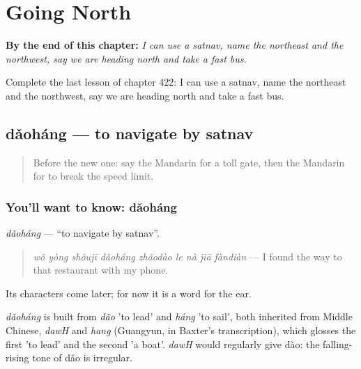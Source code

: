 
\chapter{Going North}
\label{ch:zh-going-north}

\begin{chapteropening}
\textbf{By the end of this chapter:} \emph{I can use a satnav, name the northeast and the northwest, say we are heading north and take a fast bus.}

Complete the last lesson of chapter 422: I can use a satnav, name the northeast and the northwest, say we are heading north and take a fast bus.
\end{chapteropening}

\section[dǎoháng]{dǎoháng — to navigate by satnav}

\label{lesson:ZH-C422-daohang}



\begin{quote}
Before the new one: say the Mandarin for a toll gate, then the Mandarin for to break the speed limit.
\end{quote}

\subsection*{You'll want to know: dǎoháng}
\emph{dǎoháng} — \textquotedblleft{}to navigate by satnav\textquotedblright{}.

\begin{quote}
\emph{wǒ yòng shǒujī dǎoháng zhǎodào le nà jiā fàndiàn} — I found the way to that restaurant with my phone.
\end{quote}

Its characters come later; for now it is a word for the ear.

\begin{cousinweb}
\emph{dǎoháng} is built from \emph{dǎo} 'to lead' and \emph{háng} 'to sail', both inherited from Middle Chinese, \emph{dawH} and \emph{hang} (Guangyun, in Baxter's transcription), which glosses the first 'to lead' and the second 'a boat'. \emph{dawH} would regularly give dào: the falling-rising tone of dǎo is irregular.
\end{cousinweb}

